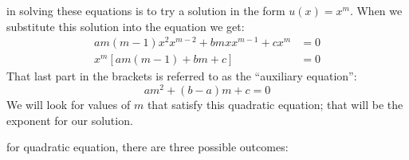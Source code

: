 in solving these equations is to try a solution in the form $u(x)=x^m$.  When we substitute this solution into the equation we get:
\begin{align*}
am(m-1)x^2x^{m-2}+bmxx^{m-1}+cx^m &=0 \\
x^m\left[am(m-1)+bm+c \right]&=0
\end{align*}
That last part in the brackets is referred to as the ``auxiliary equation'':
\begin{equation}
am^2+(b-a)m+c=0
\label{eq:CE-aux}
\end{equation}
We will look for values of $m$ that satisfy this quadratic equation; that will be the exponent for our solution.

 for quadratic equation, there are three possible outcomes: 


